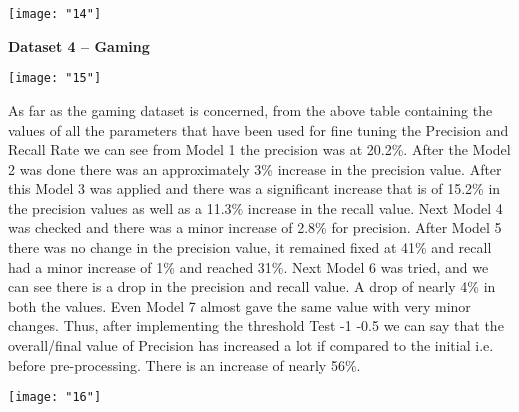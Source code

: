 \documentclass[12pt]{article}
\begin{document}
\begin{center}
	\begin{minipage}{\linewidth}
		\centering
		\texttt{[image: "14"]}
		
	\end{minipage}
\end{center}

\textbf{Dataset 4 – Gaming}

\begin{center}
	\begin{minipage}{\linewidth}
		\centering
		\texttt{[image: "15"]}
		
	\end{minipage}
\end{center}

\noindent As far as the gaming dataset is concerned, from the above table containing the values of all the parameters that have been used for fine tuning the Precision and Recall Rate we can see from Model 1 the precision was at 20.2\%. After the Model 2 was done there was an approximately 3\% increase in the precision value. After this Model 3 was applied and there was a significant increase that is of 15.2\% in the precision values as well as a 11.3\% increase in the recall value. Next Model 4 was checked and there was a minor increase of 2.8\% for precision. After Model 5 there was no change in the precision value, it remained fixed at 41\% and recall had a minor increase of 1\% and reached 31\%. Next Model 6 was tried, and we can see there is a drop in the precision and recall value. A drop of nearly 4\% in both the values. Even Model 7 almost gave the same value with very minor changes. Thus, after implementing the threshold Test -1 -0.5 we can say that the overall/final value of Precision has increased a lot if compared to the initial i.e. before pre-processing. There is an increase of nearly 56\%.

\begin{center}
	\begin{minipage}{\linewidth}
		\centering
		\texttt{[image: "16"]}
		
	\end{minipage}
\end{center}
\end{document}
